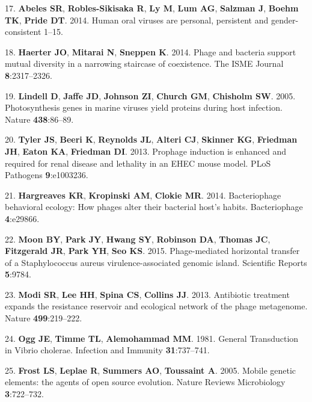 \documentclass[12pt,]{article}
\begin{document}
\hypertarget{ref-Abeles:2014kj}{}
17. \textbf{Abeles SR}, \textbf{Robles-Sikisaka R}, \textbf{Ly M},
\textbf{Lum AG}, \textbf{Salzman J}, \textbf{Boehm TK}, \textbf{Pride
DT}. 2014. Human oral viruses are personal, persistent and
gender-consistent 1--15.

\hypertarget{ref-Haerter:2014ii}{}
18. \textbf{Haerter JO}, \textbf{Mitarai N}, \textbf{Sneppen K}. 2014.
Phage and bacteria support mutual diversity in a narrowing staircase of
coexistence. The ISME Journal \textbf{8}:2317--2326.

\hypertarget{ref-Lindell:2005gz}{}
19. \textbf{Lindell D}, \textbf{Jaffe JD}, \textbf{Johnson ZI},
\textbf{Church GM}, \textbf{Chisholm SW}. 2005. Photosynthesis genes in
marine viruses yield proteins during host infection. Nature
\textbf{438}:86--89.

\hypertarget{ref-Tyler:2013fl}{}
20. \textbf{Tyler JS}, \textbf{Beeri K}, \textbf{Reynolds JL},
\textbf{Alteri CJ}, \textbf{Skinner KG}, \textbf{Friedman JH},
\textbf{Eaton KA}, \textbf{Friedman DI}. 2013. Prophage induction is
enhanced and required for renal disease and lethality in an EHEC mouse
model. PLoS Pathogens \textbf{9}:e1003236.

\hypertarget{ref-Hargreaves:2014ja}{}
21. \textbf{Hargreaves KR}, \textbf{Kropinski AM}, \textbf{Clokie MR}.
2014. Bacteriophage behavioral ecology: How phages alter their bacterial
host's habits. Bacteriophage \textbf{4}:e29866.

\hypertarget{ref-Moon:2015fa}{}
22. \textbf{Moon BY}, \textbf{Park JY}, \textbf{Hwang SY},
\textbf{Robinson DA}, \textbf{Thomas JC}, \textbf{Fitzgerald JR},
\textbf{Park YH}, \textbf{Seo KS}. 2015. Phage-mediated horizontal
transfer of a Staphylococcus aureus virulence-associated genomic island.
Scientific Reports \textbf{5}:9784.

\hypertarget{ref-Modi:2013fi}{}
23. \textbf{Modi SR}, \textbf{Lee HH}, \textbf{Spina CS},
\textbf{Collins JJ}. 2013. Antibiotic treatment expands the resistance
reservoir and ecological network of the phage metagenome. Nature
\textbf{499}:219--222.

\hypertarget{ref-Ogg:1981th}{}
24. \textbf{Ogg JE}, \textbf{Timme TL}, \textbf{Alemohammad MM}. 1981.
General Transduction in Vibrio cholerae. Infection and Immunity
\textbf{31}:737--741.

\hypertarget{ref-Frost:2005dn}{}
25. \textbf{Frost LS}, \textbf{Leplae R}, \textbf{Summers AO},
\textbf{Toussaint A}. 2005. Mobile genetic elements: the agents of open
source evolution. Nature Reviews Microbiology \textbf{3}:722--732.
\end{document}
